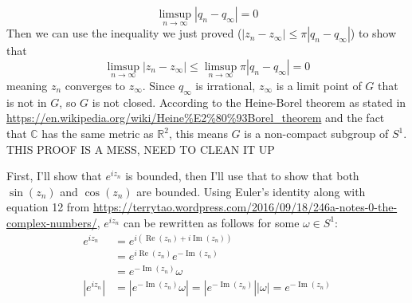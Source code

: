 \documentclass[12pt]{article}
\begin{document}
\[ \limsup_{n \rightarrow \infty} | q_n - q_\infty | = 0 \]
Then we can use the inequality we just proved ($|z_n - z_\infty| \leq \pi \left| q_n - q_\infty \right|$) to show that
    \[ \limsup_{n \rightarrow \infty} | z_n - z_\infty| \leq \limsup_{n \rightarrow \infty} \pi | q_n - q_\infty | = 0 \]
    meaning $z_n$ converges to $z_\infty$. Since $q_\infty$ is irrational, $z_\infty$ is a limit point of $G$ that is not in $G$, so $G$ is not closed. According to the Heine-Borel theorem as stated in \url{https://en.wikipedia.org/wiki/Heine%E2%80%93Borel_theorem} and the fact that $\mathbb{C}$ has the same metric as $\mathbb{R}^2$, this means $G$ is a non-compact subgroup of $S^1$.
THIS PROOF IS A MESS, NEED TO CLEAN IT UP

\bigskip
\noindent{}\bigskip

First, I'll show that $e^{i z_n}$ is bounded, then I'll use that to show that both $\sin(z_n)$ and $\cos(z_n)$ are bounded. Using Euler's identity along with equation 12 from \url{https://terrytao.wordpress.com/2016/09/18/246a-notes-0-the-complex-numbers/}, $e^{i z_n}$ can be rewritten as follows for some $\omega \in S^1$:
\begin{align*}
    e^{i z_n} &= e^{i (\operatorname{Re}(z_n) + i \operatorname{Im}(z_n))} \\
              &= e^{i \operatorname{Re}(z_n)} e^{- \operatorname{Im} (z_n)} \\
              &= e^{- \operatorname{Im}(z_n)} \omega \\
    |e^{i z_n}| &= |e^{- \operatorname{Im}(z_n)} \omega| = |e^{- \operatorname{Im}(z_n)}| |\omega| = e^{- \operatorname{Im}(z_n)}
\end{align*}
\end{document}
